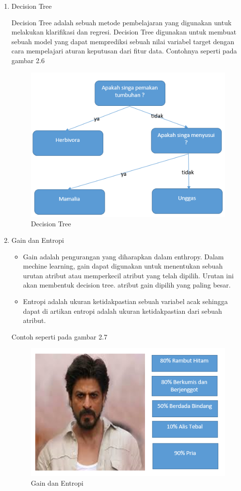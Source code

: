\begin{enumerate}
\item Decision Tree
\par 
Decision Tree adalah sebuah metode pembelajaran yang digunakan untuk melakukan klarifikasi dan regresi. Decision Tree digunakan untuk membuat sebuah model yang dapat memprediksi sebuah nilai variabel target dengan cara mempelajari aturan keputusan dari fitur data. Contohnya seperti pada gambar 2.6 
\begin{figure}[ht]
\centering
\includegraphics[scale=0.9]{figures/zulfikar/6.png}
\caption{Decision Tree}
\end{figure}

\item Gain dan Entropi
\begin{itemize}
\item Gain adalah pengurangan yang diharapkan dalam enthropy. Dalam mechine learning, gain dapat digunakan untuk menentukan sebuah urutan atribut atau memperkecil atribut yang telah dipilih. Urutan ini akan membentuk decision tree. atribut gain dipilih yang paling besar.
\item  Entropi adalah ukuran ketidakpastian sebuah variabel acak sehingga dapat di artikan entropi adalah ukuran ketidakpastian dari sebuah atribut.
\end{itemize}
\par Contoh seperti pada gambar 2.7
\begin{figure}[ht]
\centering
\includegraphics[scale=0.9]{figures/zulfikar/7.png}
\caption{Gain dan Entropi}
\end{figure}
\end{enumerate}

